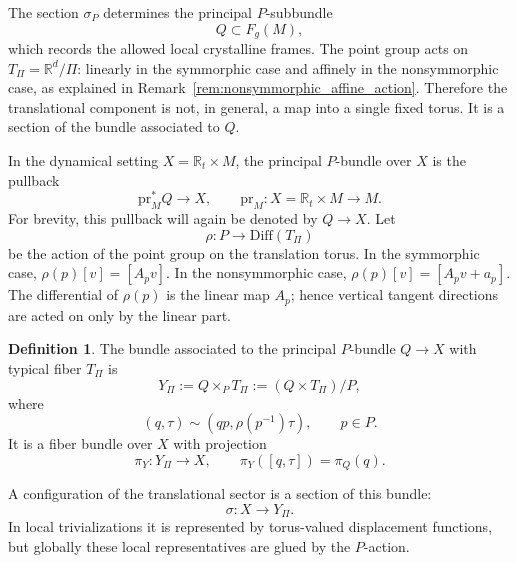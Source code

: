 \documentclass[11pt]{amsart}
\theoremstyle{plain}
\theoremstyle{definition}
\newtheorem{definition}[proposition]{Definition}
\theoremstyle{remark}
\begin{document}
The section \(\sigma_P\) determines the principal \(P\)-subbundle
\[
Q\subset F_g(M),
\]
which records the allowed local crystalline frames. 
The point group acts on \(T_\Pi=\mathbb R^d/\Pi\): linearly in the symmorphic case and affinely in the nonsymmorphic case, as explained in Remark~\ref{rem:nonsymmorphic_affine_action}. 
Therefore the translational component is not, in general, a map into a single fixed torus. 
It is a section of the bundle associated to \(Q\).

\medskip

In the dynamical setting \(X=\mathbb R_t\times M\), the principal \(P\)-bundle over \(X\) is the pullback
\[
\mathrm{pr}_M^*Q\longrightarrow X,
\qquad
\mathrm{pr}_M:X=\mathbb R_t\times M\to M.
\]
For brevity, this pullback will again be denoted by \(Q\to X\). 
Let
\begin{equation}
	\rho:P\to \mathrm{Diff}(T_\Pi)
	\label{eq:rho_action}
\end{equation}
be the action of the point group on the translation torus. 
In the symmorphic case, \(\rho(p)[v]=[A_pv]\). 
In the nonsymmorphic case, \(\rho(p)[v]=[A_pv+a_p]\). 
The differential of \(\rho(p)\) is the linear map \(A_p\); hence vertical tangent directions are acted on only by the linear part.

\begin{definition}
	\label{def:associated_torus_bundle}
	The bundle associated to the principal \(P\)-bundle \(Q\to X\) with typical fiber \(T_\Pi\) is
	\begin{equation}
		Y_\Pi:=Q\times_P T_\Pi:=(Q\times T_\Pi)/P,
		\label{eq:Ypi}
	\end{equation}
	where
	\begin{equation}
		(q,\tau)\sim (qp,\rho(p^{-1})\tau),
		\qquad p\in P.
		\label{eq:Ypi_equiv}
	\end{equation}
	It is a fiber bundle over \(X\) with projection
	\begin{equation}
		\pi_Y:Y_\Pi\to X,
		\qquad
		\pi_Y([q,\tau])=\pi_Q(q).
		\label{eq:Ypi_projection}
	\end{equation}
\end{definition}

A configuration of the translational sector is a section of this bundle:
\[
\sigma:X\to Y_\Pi.
\]
In local trivializations it is represented by torus-valued displacement functions, but globally these local representatives are glued by the \(P\)-action.
\end{document}
